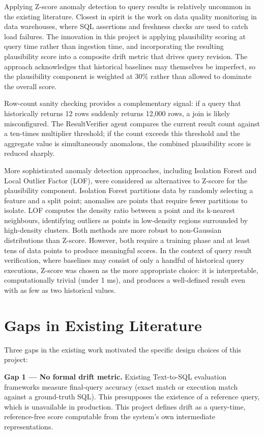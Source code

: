 \documentclass[12pt,a4paper]{report}
\begin{document}
Applying Z-score anomaly detection to query results is relatively uncommon in the existing literature. Closest in spirit is the work on data quality monitoring in data warehouses, where SQL assertions and freshness checks are used to catch load failures. The innovation in this project is applying plausibility scoring at query time rather than ingestion time, and incorporating the resulting plausibility score into a composite drift metric that drives query revision. The approach acknowledges that historical baselines may themselves be imperfect, so the plausibility component is weighted at 30\% rather than allowed to dominate the overall score.

Row-count sanity checking provides a complementary signal: if a query that historically returns 12 rows suddenly returns 12,000 rows, a join is likely misconfigured. The ResultVerifier agent compares the current result count against a ten-times multiplier threshold; if the count exceeds this threshold and the aggregate value is simultaneously anomalous, the combined plausibility score is reduced sharply.

More sophisticated anomaly detection approaches, including Isolation Forest and Local Outlier Factor (LOF), were considered as alternatives to Z-score for the plausibility component. Isolation Forest partitions data by randomly selecting a feature and a split point; anomalies are points that require fewer partitions to isolate. LOF computes the density ratio between a point and its k-nearest neighbours, identifying outliers as points in low-density regions surrounded by high-density clusters. Both methods are more robust to non-Gaussian distributions than Z-score. However, both require a training phase and at least tens of data points to produce meaningful scores. In the context of query result verification, where baselines may consist of only a handful of historical query executions, Z-score was chosen as the more appropriate choice: it is interpretable, computationally trivial (under 1 ms), and produces a well-defined result even with as few as two historical values.

\section{Gaps in Existing Literature}
\label{sec:literature-gaps}

Three gaps in the existing work motivated the specific design choices of this project:

\textbf{Gap 1 — No formal drift metric.} Existing Text-to-SQL evaluation frameworks measure final-query accuracy (exact match or execution match against a ground-truth \ac{SQL}). This presupposes the existence of a reference query, which is unavailable in production. This project defines drift as a query-time, reference-free score computable from the system's own intermediate representations.
\end{document}

